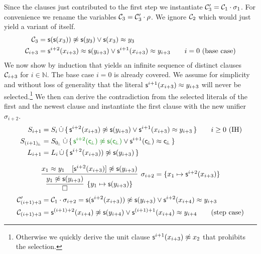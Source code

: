 \begin{example}
Since the clauses just contributed to the first step
we instantiate \(\mathcal{C}'_3 = \mathcal{C}_1\cdot\sigma_1\).
For convenience we rename the variables \(\mathcal{C}_3 = \mathcal{C}_3'\cdot\rho\).
We ignore \(\mathcal{C}_2\) which would just yield a variant of itself.
\begin{align*}
	\mathcal{C}_3 &= \mathsf{s}(\mathsf{s}(x_3)) \not\approx \mathsf{s}(y_3) \lor \mathsf{s}(x_3) \approx y_3
	\\
	\mathcal{C}_{i+3} &= \mathsf{s}^{i+2}(x_{i+3})\approx \mathsf{s}(y_{i+3}) \lor \mathsf{s}^{i+1}(x_{i+3})\approx y_{i+3}
	\tag*{\(i=0\) (base case)}
	\end{align*}
	We now show by induction that \InstGenEQ yields an infinite sequence of distinct clauses \(\mathcal{C}_{i+3}\) for \(i\in\mathbb{N}\).
	The base case \(i=0\) is already covered. We assume for simplicity and without loss of generality that the literal \(\mathsf{s}^{i+1}(x_{i+3})\approx y_{i+3}\) will never be selected.\footnote{
		Otherwise we quickly derive the unit clause \(\mathsf{s}^{i+1}(x_{i+3})\not\approx x_2\) that prohibits the selection.}
	We then can derive the contradiction from the selected literals of the first and the newest clause
	and instantiate the first clause with the new unifier \(\sigma_{i+2}\).
	\begin{align*}
	S_{i+1} &= S_i\disjointunion\, \{\,
	\msucc^{i+2}(x_{i+3}) \mNE \msucc(y_{i+3}) \lor \msucc^{i+1}(x_{i+3}) \mEQ y_{i+3} \,
	\}
	\tag*{\(i\geq 0\) (IH)}
	\\
	S_{(i+1)\!_\bot} &= S_{0\!_\bot}\disjointunion\, \{\,
	{\colHi\msucc^{i+2}(\consbot) \mNE \msucc(\consbot)} \lor {\msucc^{i+1}(\consbot) \mEQ \consbot} \,
	\}
	\\
	L_{i+1} &= L_i \disjointunion\, \{\,
		\msucc^{i+2}(x_{i+3})) \mNE \msucc(y_{i+3})
	\,\}
	\\[0.7em]
	&\infer[\sigma_{i+2} = \{ x_1\mapsto \msucc^{i+2}(x_{i+3})\}
	]{
		\infer[\{y_1\mapsto \msucc(y_{i+3})\}]{\emptyclause}{ y_1\mNE \msucc(y_{i+3}) }
	}
	{x_1 \mEQ y_1 & [\msucc^{i+2}(x_{i+3})]\mNE \msucc(y_{i+3})}
	\\
	\mcC'_{(i+1)+3} &= \mcC_1\cdot\sigma_{i+2} =
	\msucc(\msucc^{i+2}(x_{i+3})) \mNE \msucc(y_{i+3}) \lor \msucc^{i+2}(x_{i+4}) \mEQ y_{i+3}
	\\
	\mcC_{(i+1)+3} &=
	\msucc^{(i+1)+2}(x_{i+4}) \mNE \msucc(y_{i+4}) \lor \msucc^{(i+1)+1}(x_{i+4}) \mEQ y_{i+4}
	\tag{step case}
\end{align*}


\end{example}
